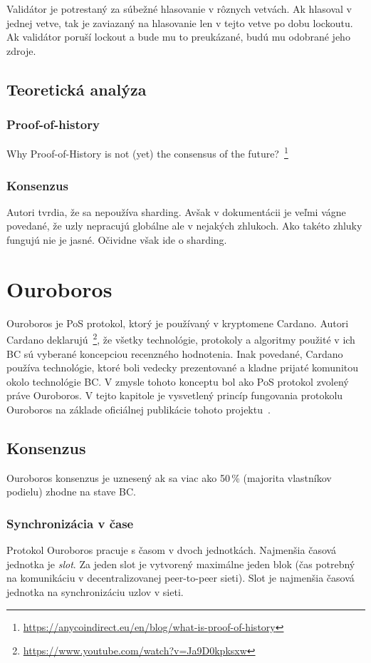 Validátor je potrestaný za súbežné hlasovanie v rôznych vetvách. Ak hlasoval v jednej vetve, tak je zaviazaný na hlasovanie len v tejto vetve po dobu lockoutu. Ak validátor poruší lockout a bude mu to preukázané, budú mu odobrané jeho zdroje.

\section{Teoretická analýza}\label{sec:solana-teor}

\subsection{Proof-of-history}

Why Proof-of-History is not (yet) the consensus of the future?~\footnote{\url{https://anycoindirect.eu/en/blog/what-is-proof-of-history}}

\subsection{Konsenzus}
Autori tvrdia, že sa nepoužíva sharding. Avšak v dokumentácii je veľmi vágne povedané, že uzly nepracujú globálne ale v nejakých zhlukoch. Ako takéto zhluky fungujú nie je jasné. Očividne však ide o sharding.

\chapter{Ouroboros}

Ouroboros je PoS protokol, ktorý je používaný v kryptomene Cardano. Autori Cardano deklarujú~\footnote{\url{https://www.youtube.com/watch?v=Ja9D0kpksxw}}, že všetky technológie, protokoly a algoritmy použité v ich BC sú vyberané koncepciou recenzného hodnotenia. Inak povedané, Cardano používa technológie, ktoré boli vedecky prezentované a kladne prijaté komunitou okolo technológie BC. V zmysle tohoto konceptu bol ako PoS protokol zvolený práve Ouroboros. V tejto kapitole je vysvetlený princíp fungovania protokolu Ouroboros na základe oficiálnej publikácie tohoto projektu~\cite{ouroborosWp}.

\section{Konsenzus}
Ouroboros konsenzus je uznesený ak sa viac ako 50\,\% (majorita vlastníkov podielu) zhodne na stave BC.

\subsection{Synchronizácia v čase}
Protokol Ouroboros pracuje s časom v dvoch jednotkách. Najmenšia časová jednotka je \textit{slot}. Za jeden slot je vytvorený maximálne jeden blok (čas potrebný na komunikáciu v decentralizovanej peer-to-peer sieti). Slot je najmenšia časová jednotka na synchronizáciu uzlov v sieti. 

